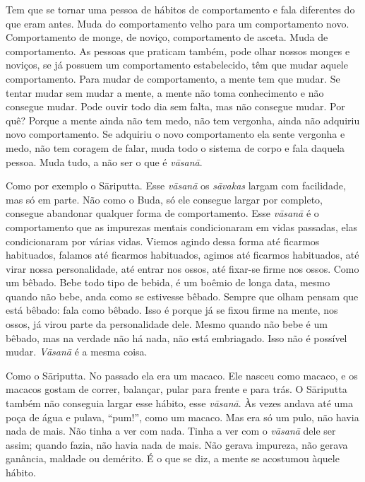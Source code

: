 Tem que se tornar uma pessoa de hábitos de comportamento e fala
diferentes do que eram antes. Muda do comportamento velho para um
comportamento novo. Comportamento de monge, de noviço, comportamento de
asceta. Muda de comportamento. As pessoas que praticam também, pode
olhar nossos monges e noviços, se já possuem um comportamento
estabelecido, têm que mudar aquele comportamento. Para mudar de
comportamento, a mente tem que mudar. Se tentar mudar sem mudar a
mente, a mente não toma conhecimento e não consegue mudar. Pode ouvir
todo dia sem falta, mas não consegue mudar. Por quê? Porque a mente
ainda não tem medo, não tem vergonha, ainda não adquiriu novo
comportamento. Se adquiriu o novo comportamento ela sente vergonha e
medo, não tem coragem de falar, muda todo o sistema de corpo e fala
daquela pessoa. Muda tudo, a não ser o que é \textit{vāsanā}. 

Como por exemplo o Sāriputta. Esse \textit{vāsanā} os
\textit{sāvakas} largam com facilidade, mas só em parte. Não como o
Buda, só ele consegue largar por completo, consegue abandonar qualquer
forma de comportamento. Esse \textit{vāsanā} é o comportamento que
as impurezas mentais condicionaram em vidas passadas, elas
condicionaram por várias vidas. Viemos agindo dessa forma até ficarmos
habituados, falamos até ficarmos habituados, agimos até ficarmos
habituados, até virar nossa personalidade, até entrar nos ossos, até
fixar-se firme nos ossos. Como um bêbado. Bebe todo tipo de bebida, é
um boêmio de longa data, mesmo quando não bebe, anda como se estivesse
bêbado. Sempre que olham pensam que está bêbado: fala como bêbado. Isso
é porque já se fixou firme na mente, nos ossos, já virou parte da
personalidade dele. Mesmo quando não bebe é um bêbado, mas na verdade
não há nada, não está embriagado. Isso não é possível mudar.
\textit{Vāsanā} é a mesma coisa. 

Como o Sāriputta. No passado ela era um macaco. Ele nasceu como
macaco, e os macacos gostam de correr, balançar, pular para frente e
para trás. O Sāriputta também não conseguia largar esse hábito, esse
\textit{vāsanā}. Às vezes andava até uma poça de água e pulava,
“pum!”, como um macaco. Mas era só um pulo, não havia nada de mais. Não
tinha a ver com nada. Tinha a ver com o \textit{vāsanā} dele ser
assim; quando fazia, não havia nada de mais. Não gerava impureza, não
gerava ganância, maldade ou demérito. É o que se diz, a mente se
acostumou àquele hábito. 

